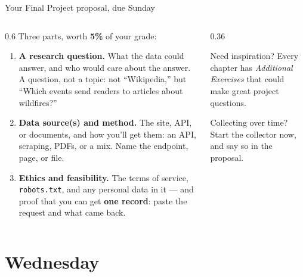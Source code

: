 \documentclass[9pt,aspectratio=169]{beamer}
\begin{document}
\begin{frame}{Your Final Project proposal, due Sunday}
    \begin{columns}[T]
        \begin{column}{0.6\textwidth}
            Three parts, worth \textbf{5\%} of your grade:
            \begin{enumerate}\small
                \item \textbf{A research question.} What the data could answer, and who would care about the answer. A question, not a topic: not ``Wikipedia,'' but ``Which events send readers to articles about wildfires?''
                \item \textbf{Data source(s) and method.} The site, API, or documents, and how you'll get them: an API, scraping, PDFs, or a mix. Name the endpoint, page, or file.
                \item \textbf{Ethics and feasibility.} The terms of service, \texttt{robots.txt}, and any personal data in it --- and proof that you can get \textbf{one record}: paste the request and what came back.
            \end{enumerate}
        \end{column}
        \begin{column}{0.36\textwidth}
            \begin{block}{Need inspiration?}
                \footnotesize Every chapter has \textit{Additional Exercises} that could make great project questions.
            \end{block}
            \begin{alertblock}{Collecting over time?}
                \footnotesize Start the collector now, and say so in the proposal.
            \end{alertblock}
        \end{column}
    \end{columns}
\end{frame}

\section{Wednesday}

\end{document}
